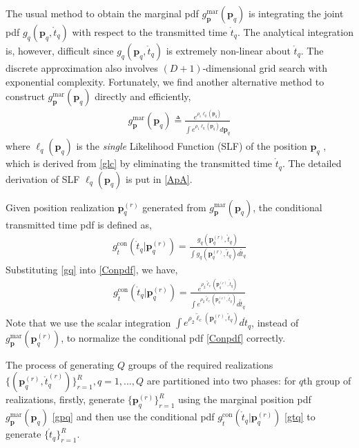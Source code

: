\documentclass[review]{elsarticle}
\begin{document}
The usual method to obtain the marginal pdf $g_{\boldsymbol{p}}^{\text{mar}}(\boldsymbol{p}_q)$ is integrating the joint pdf $g_q(\boldsymbol{p}_q,\mathring{t}_q)$ with respect to the transmitted time $\mathring{t}_q$. The analytical integration is, however, difficult since $g_q(\boldsymbol{p}_q,\mathring{t}_q)$ is extremely non-linear about $\mathring{t}_q$. The discrete approximation also involves $(D+1)$-dimensional grid search with exponential complexity. Fortunately, we find another alternative method to construct $ g_{\boldsymbol{p}}^{\text{mar}}(\boldsymbol{p}_q)$ directly and efficiently,
\begin{align}\label{gmar}
    g_{\boldsymbol{p}}^{\text{mar}}(\boldsymbol{p}_q)\triangleq\frac{e^{\rho_1\ell_q(\boldsymbol{p}_q)}}{\int e^{\rho_1\ell_q(\boldsymbol{p}_q)} d\boldsymbol{p}_q}
\end{align} 
where $\ell_q(\boldsymbol{p}_q)$ is the \emph{single} Likelihood Function (SLF) of the position $\boldsymbol{p}_q$ , which is derived from \eqref{glc} by eliminating the transmitted time $\mathring{t}_q$. The detailed derivation of SLF $\ell_q(\boldsymbol{p}_q)$ is put in \ref{ApA}. 

Given position realization $\boldsymbol{p}_q^{(r)}$ generated from $g_{\boldsymbol{p}}^{\text{mar}}(\boldsymbol{p}_q)$, the conditional transmitted time pdf is defined as,
\begin{align}\label{Conpdf}
    g_{\mathring{t}}^{\text{con}}(\mathring{t}_q\vert \boldsymbol{p}_q^{(r)})=\frac{g_q(\boldsymbol{p}_q^{(r)},\mathring{t}_q)}{\int g_q(\boldsymbol{p}_q^{(r)},\mathring{t}_q)d\mathring{t}_q}
\end{align}
Substituting \eqref{gq} into \eqref{Conpdf}, we have,
\begin{align}\label{gtq}
    g_{\mathring{t}}^{\text{con}}(\mathring{t}_q\vert \boldsymbol{p}_q^{(r)})=\frac{e^{\rho_2 \tilde{\ell}_c(\boldsymbol{p}^{(r)}_q,\mathring{t}_q)}}{\int e^{\rho_2 \tilde{\ell}_c(\boldsymbol{p}^{(r)}_q,\mathring{t}_q)}d\mathring{t}_q}
\end{align}
Note that we use the scalar integration $\int e^{\rho_2 \tilde{\ell}_c(\boldsymbol{p}^{(r)}_q,\mathring{t}_q)}d\mathring{t}_q$, instead of $g_{\boldsymbol{p}}^{\text{mar}}(\boldsymbol{p}_q^{(r)})$, to normalize the conditional pdf \eqref{Conpdf} correctly. 

The process of generating $Q$ groups of the required realizations $\lbrace(\boldsymbol{p}_q^{(r)},\mathring{t}_q^{(r)})\rbrace_{r=1}^{R},q=1,...,Q$ are partitioned into two phases: for $q$th group of realizations, firstly, generate $\lbrace \boldsymbol{p}_q^{(r)}\rbrace_{r=1}^R$ using the marginal position pdf $g_{\boldsymbol{p}}^{\text{mar}}(\boldsymbol{p}_q)$ \eqref{gpq} and then use the conditional pdf $g_{\mathring{t}}^{\text{con}}(\mathring{t}_q\vert \boldsymbol{p}_q^{(r)})$ \eqref{gtq} to generate $\lbrace \mathring{t}_q\rbrace_{r=1}^R$.
\end{document}
